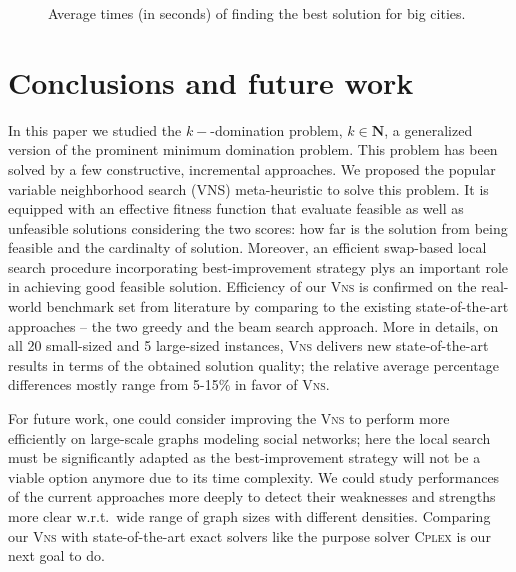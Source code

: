 \documentclass[dvipsnames,format=sigconf,anonymous=true,review=true]{acmart}
\begin{document}
\begin{figure}
	\caption{Average times (in seconds) of finding the best solution for big cities.}
	\label{fig:timeBig}  
\end{figure}
 
\section{Conclusions and future work}

 
 In this paper we studied the $k-$-domination problem, $k \in \mathbf{N}$,  a generalized version of the prominent minimum domination problem. This problem has been solved by a few constructive, incremental approaches. We proposed the popular variable neighborhood search (VNS) meta-heuristic to solve this problem. It is equipped with an effective fitness function that evaluate feasible as well as unfeasible solutions considering the two scores: how far is the solution from being feasible and the cardinalty of   solution.  Moreover, an efficient swap-based local search procedure incorporating best-improvement strategy plys an important role in achieving good feasible solution.  Efficiency of our \textsc{Vns} is confirmed on the real-world benchmark set from literature by comparing to the existing state-of-the-art approaches -- the two greedy and the beam search approach. More in details, on all 20 small-sized and 5 large-sized instances, \textsc{Vns} delivers new state-of-the-art results in terms of the obtained solution quality; the relative average percentage differences mostly range from 5-15\% in favor of \textsc{Vns}. 
 
 For future work, one could consider improving the \textsc{Vns} to perform more efficiently on large-scale graphs modeling social networks; here the local search must be significantly adapted as the best-improvement strategy will not be a viable option anymore due to  its time complexity.  We could study performances of the current approaches more deeply to detect their weaknesses and strengths more clear w.r.t.\  wide range of graph sizes with different densities. Comparing our \textsc{Vns} with state-of-the-art exact solvers like the purpose solver \textsc{Cplex}  is our next goal to do. 
  
\end{document}
